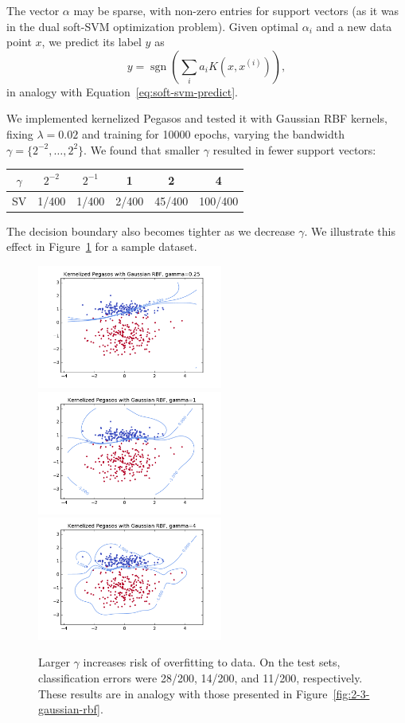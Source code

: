 \documentclass{article}
\DeclareMathOperator{\sgn}{sgn}
\begin{document}
\begin{multicols}{2}
The vector $\alpha$ may be sparse,
with non-zero entries for support vectors
(as it was in the dual soft-SVM optimization problem).
Given optimal $\alpha_i$ and a new data point $x$,
we predict its label $y$ as
\begin{equation}
    y = \sgn\left(\sum_i{a_i K(x,x^{(i)})}\right),
\end{equation}
in analogy with Equation~\ref{eq:soft-svm-predict}.

We implemented kernelized Pegasos
and tested it with Gaussian RBF kernels,
fixing $\lambda = 0.02$ and training for 10000 epochs,
varying the bandwidth $\gamma = \{2^{-2},\dots,2^2\}$.
We found that smaller $\gamma$ resulted in fewer support vectors:
\begin{center}
    \begin{tabular}{|c||c|c|c|c|c|}
    \hline
    $\gamma$ & $2^{-2}$ & $2^{-1}$ & 1 & 2 & 4\\ \hline
    SV & 1/400 & 1/400 & 2/400 & 45/400 & 100/400 \\ \hline
    \end{tabular}
\end{center}
The decision boundary also becomes tighter as we decrease $\gamma$.
We illustrate this effect in Figure~\ref{fig:3-3-gamma} for a sample dataset.

\begin{figure}[t]
    \centering
	\includegraphics[width=2.4in]{img/3-2-margins/3-3-kernel-025.pdf}
	\includegraphics[width=2.4in]{img/3-2-margins/3-3-kernel-1.pdf}
	\includegraphics[width=2.4in]{img/3-2-margins/3-3-kernel-4.pdf}
    \caption{Larger $\gamma$ increases risk of overfitting to data.
       On the test sets,
       classification errors were 28/200, 14/200, and 11/200, respectively.
       These results are in analogy
       with those presented in Figure~\ref{fig:2-3-gaussian-rbf}.
    }
    \label{fig:3-3-gamma}
\end{figure}



\end{multicols}
\end{document}
